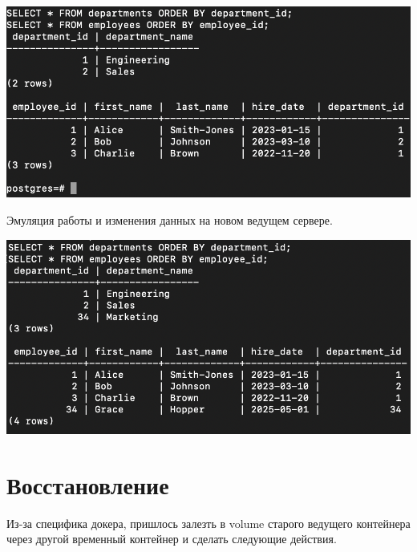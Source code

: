 \documentclass{article}
\begin{document}
\begin{center}
    \includegraphics[width=.9\textwidth]{check-promote.png}
\end{center}
Эмуляция работы и изменения данных на новом ведущем сервере.
\begin{center}
    \includegraphics[width=.9\textwidth]{promote-primary.png}
\end{center}

\section*{Восстановление}
Из-за специфика докера, пришлось залезть в volume старого ведущего контейнера через другой временный контейнер и сделать следующие действия. 
\end{document}
